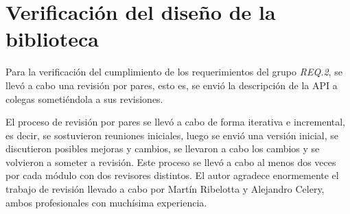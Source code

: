 \section{Verificación del diseño de la biblioteca}

Para la verificación del cumplimiento de los requerimientos del grupo \emph{REQ.2}, se llevó a cabo una revisión por pares, esto es, se envió la descripción de la API a colegas sometiéndola a sus revisiones. 

El proceso de revisión por pares se llevó a cabo de forma iterativa e incremental, es decir, se sostuvieron reuniones iniciales, luego se envió una versión inicial, se discutieron posibles mejoras y cambios, se llevaron a cabo los cambios y se volvieron a someter a revisión. Este proceso se llevó a cabo al menos dos veces por cada módulo con dos revisores distintos. El autor agradece enormemente el trabajo de revisión llevado a cabo por Martín Ribelotta y Alejandro Celery, ambos profesionales con muchísima experiencia.

